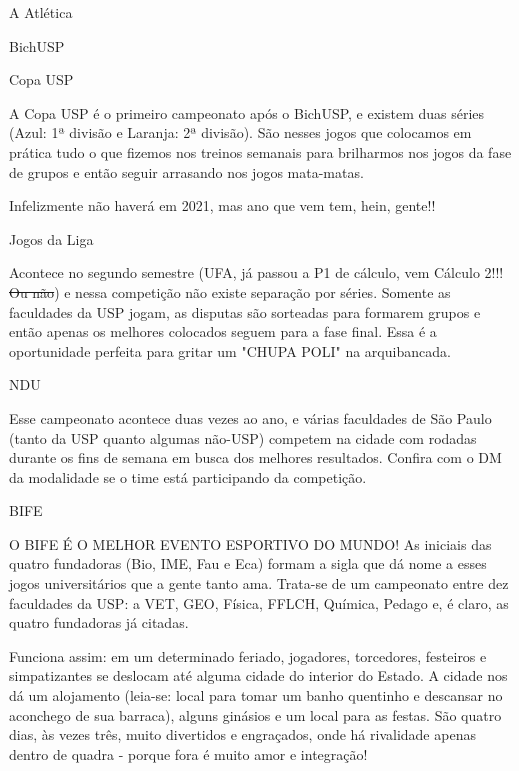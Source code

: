 \begin{secao}{A Atlética}
\begin{subsecao}{BichUSP}
\end{subsecao}
\begin{subsecao}{Copa USP}

A Copa USP é o primeiro campeonato após o BichUSP, e existem duas séries (Azul:
1ª divisão e Laranja: 2ª divisão). São nesses jogos que colocamos em prática
tudo o que fizemos nos treinos semanais para brilharmos nos jogos da fase de
grupos e então seguir arrasando nos jogos mata-matas.

Infelizmente não haverá em 2021, mas ano que vem tem, hein, gente!!

\end{subsecao}
\begin{subsecao}{Jogos da Liga}

Acontece no segundo semestre (UFA, já passou a P1 de cálculo, vem Cálculo 2!!!
\sout{Ou não}) e nessa competição não existe separação por séries. Somente as
faculdades da USP jogam, as disputas são sorteadas para formarem grupos e
então apenas os melhores colocados seguem para a fase final. Essa é a
oportunidade perfeita para gritar um "CHUPA POLI" na arquibancada.

\end{subsecao}
\begin{subsecao}{NDU}

Esse campeonato acontece duas vezes ao ano, e várias faculdades de São Paulo
(tanto da USP quanto algumas não-USP) competem na cidade com rodadas durante
os fins de semana em busca dos melhores
resultados. Confira com o DM da modalidade se o time está participando da
competição.

\end{subsecao}
\begin{subsecao}{BIFE}

O BIFE É O MELHOR EVENTO ESPORTIVO DO MUNDO! As iniciais das quatro fundadoras
(Bio, IME, Fau e Eca) formam a sigla que dá nome a esses jogos universitários
que a gente tanto ama. Trata-se de um campeonato entre dez faculdades da USP:
a VET, GEO, Física, FFLCH, Química, Pedago e, é claro, as quatro fundadoras já citadas.

Funciona assim: em um determinado feriado, jogadores, torcedores, festeiros e
simpatizantes se deslocam até alguma cidade do interior do Estado. A cidade nos
dá um alojamento (leia-se: local para tomar um banho quentinho e descansar no
aconchego de sua barraca), alguns ginásios e um local para as festas. São
quatro dias, às vezes três, muito divertidos e engraçados, onde há rivalidade apenas dentro de
quadra - porque fora é muito amor e integração!


\end{subsecao}
\end{secao}
